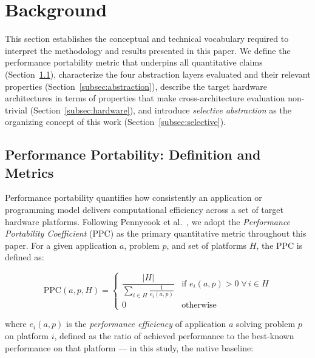 
\section{Background}
\label{sec:background}

This section establishes the conceptual and technical vocabulary required to
interpret the methodology and results presented in this paper. We define the
performance portability metric that underpins all quantitative claims
(Section~\ref{subsec:ppc}), characterize the four abstraction layers evaluated
and their relevant properties (Section~\ref{subsec:abstraction}), describe the
target hardware architectures in terms of properties that make cross-architecture
evaluation non-trivial (Section~\ref{subsec:hardware}), and introduce
\emph{selective abstraction} as the organizing concept of this work
(Section~\ref{subsec:selective}).

\subsection{Performance Portability: Definition and Metrics}
\label{subsec:ppc}

Performance portability quantifies how consistently an application or
programming model delivers computational efficiency across a set of target
hardware platforms. Following Pennycook et al.~\cite{Pennycook2019}, we adopt
the \emph{Performance Portability Coefficient} (PPC) as the primary
quantitative metric throughout this paper. For a given application $a$,
problem $p$, and set of platforms $H$, the PPC is defined as:

\begin{equation}
    \text{PPC}(a, p, H) =
    \begin{cases}
        \dfrac{|H|}{\displaystyle\sum_{i \in H} \frac{1}{e_i(a,p)}}
        & \text{if } e_i(a,p) > 0 \; \forall \, i \in H \\[10pt]
        0 & \text{otherwise}
    \end{cases}
    \label{eq:ppc}
\end{equation}

\noindent where $e_i(a, p)$ is the \emph{performance efficiency} of
application $a$ solving problem $p$ on platform $i$, defined as the ratio
of achieved performance to the best-known performance on that platform ---
in this study, the native baseline:

